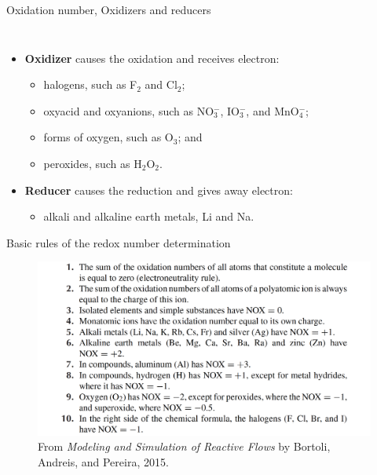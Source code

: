 \begin{frame}{Oxidation number, Oxidizers and reducers }
\begin{columns}
\begin{column}{0.3\textwidth}
\begin{figure}[!t]
			\end{figure}
		\end{column}
	\end{columns}
	\vskip -15pt
	\pause
	\begin{itemize}
	\item \alert{\bf Oxidizer} causes the oxidation and receives electron:
	\begin{itemize}
		\item halogens, such as F$_2$ and Cl$_2$;
		\item oxyacid and oxyanions, such as NO$^-_3$, IO$^-_3$, and MnO$^-_4$;
		\item forms of oxygen, such as O$_3$; and
		\item peroxides, such as H$_2$O$_2$.
	\end{itemize}
 	\pause
	\item \alert{\bf Reducer} causes the reduction and gives away electron:
	\begin{itemize}
		\item alkali and alkaline earth metals, Li and Na.
	\end{itemize}
	\end{itemize}
\end{frame}
%
%
\begin{frame}{Basic rules of the redox number determination}
	\vskip 10pt
	\begin{figure}[!t]
		\includegraphics[width=0.77\columnwidth]{figures/chemical-kinetics/nox-rules.png}
		\caption{From \emph{Modeling and Simulation of Reactive Flows} by Bortoli, Andreis, and Pereira, 2015.}
	\end{figure}
\end{frame}
%
